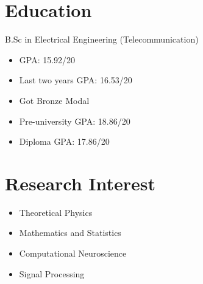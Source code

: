 \documentclass[11pt,a4paper,sans]{moderncv}        %
\begin{document}
\vspace*{-1.05mm}
\makecvtitle
\vspace*{-10mm}
\section{Education}
{\hspace*{-2.5 mm} }{ B.Sc in Electrical Engineering (Telecommunication) }
\begin{itemize}
    \item GPA: 15.92/20
    \item Last two years GPA: 16.53/20
\end{itemize}

\vspace*{3 mm}

\begin{itemize}
    \item Got Bronze Modal
\end{itemize}
\vspace*{3 mm}

\begin{itemize}
    \item Pre-university GPA: 18.86/20
    \item Diploma GPA: 17.86/20
\end{itemize}

\section{Research Interest}
\vspace{-1.0em}\begin{small}
    \begin{multicols}{2}
        \begin{itemize}
            \item Theoretical Physics
            \item Mathematics and Statistics
            \item Computational Neuroscience
            \item Signal Processing
        \end{itemize}
    \end{multicols}\end{small}
\end{document}
